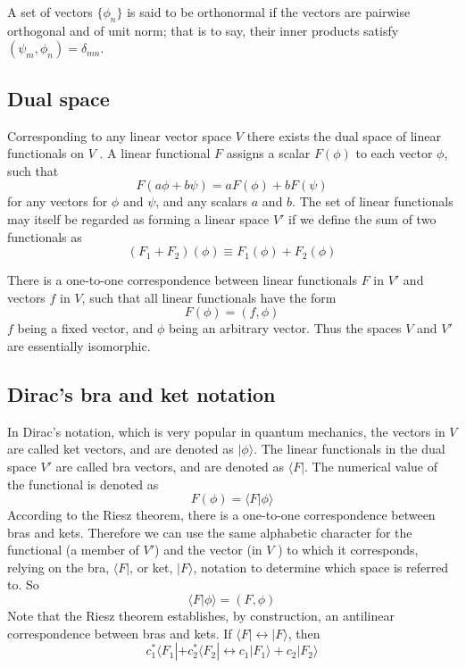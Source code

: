 \begin{newdef}[Orthonormal]
A set of vectors $\{\phi_n\}$ is said to be orthonormal if the vectors are pairwise orthogonal and of unit norm; that is to say, their inner products satisfy $(\psi_m,\phi_n) = \delta_{mn}$.
\end{newdef}

\subsection{Dual space}
\begin{newdef}
Corresponding to any linear vector space $V$ there exists the dual space of linear functionals on $V$ . A linear functional $F$ assigns a scalar $F(\phi)$ to each vector $\phi$, such that
\[F(a\phi+b\psi) = aF(\phi) + bF(\psi)\]
for any vectors for $\phi$ and $\psi$, and any scalars $a$ and $b$. The set of linear functionals may itself be regarded as forming a linear space $V'$ if we define the sum of two functionals as
\[(F_1+F_2)(\phi) \equiv F_1(\phi) + F_2(\phi)\]
\end{newdef}

\begin{newthem} 
There is a one-to-one correspondence between linear functionals $F$ in $V'$ and vectors $f$ in $V$, such that all linear functionals have the form
\[F(\phi) = (f,\phi)\]
$f$ being a fixed vector, and $\phi$ being an arbitrary vector. Thus the spaces $V$ and $V'$ are essentially isomorphic.
\end{newthem}

\subsection{Dirac's bra and ket notation}
\noindent
In Dirac's notation, which is very popular in quantum mechanics, the vectors in $V$ are called ket vectors, and are denoted as $|\phi \rangle$. The linear functionals in the dual space $V'$ are called bra vectors, and are denoted as $\langle F |$. The numerical value of the functional is denoted as
\[F(\phi) = \langle F | \phi \rangle\]
According to the Riesz theorem, there is a one-to-one correspondence between bras and kets. Therefore we can use the same alphabetic character for the functional (a member of $V'$) and the vector (in $V$ ) to which it corresponds, relying on the bra, $\langle F |$, or ket, $|F\rangle$, notation to determine which space is referred to. So
\[\langle F | \phi \rangle = (F,\phi)\]
Note that the Riesz theorem establishes, by construction, an antilinear correspondence between bras and kets. If $\langle F | \leftrightarrow  |F\rangle$, then
\[c_1^* \langle F_1 | + c_2^* \langle F_2 | \leftrightarrow  c_1 |F_1\rangle + c_2|F_2\rangle\]

